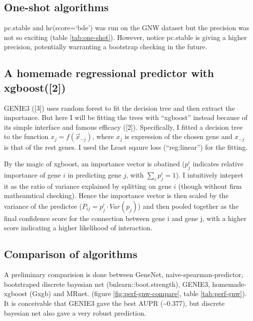 \documentclass[]{article}
\theoremstyle{definition}
\theoremstyle{definition}
\theoremstyle{definition}
\theoremstyle{remark}
\begin{document}
\subsection{One-shot algorithms}\label{one-shot-algorithms}

pc.stable and hc(score=`bde') was run on the GNW dataset but the
precision was not so exciting (table \ref{tab:one-shot}). However,
notice pc.stable is giving a higher precision, potentially warranting a
bootstrap checking in the future.

\subsection{A homemade regressional predictor with
xgboost({[}2{]})}\label{a-homemade-regressional-predictor-with-xgboostxgboost}

GENIE3 ({[}3{]}) uses random forest to fit the decision tree and then
extract the importance. But here I will be fitting the trees with
``xgboost'' instead because of its simple interface and famous efficacy
({[}2{]}). Specifically, I fitted a decision tree to the function
\(x_j = f(\vec{x}_{-j})\), where \(x_j\) is expression of the chosen
gene and \(x_{-j}\) is that of the rest genes. I used the Least sqaure
loss (``reg:linear'') for the fitting.

By the magic of xgboost, an importance vector is obatined (\(p_j^i\)
indicates relative importance of gene \(i\) in predicting gene \(j\),
with \(\sum_{i}p_j^i=1\)). I intuitively intepret it as the ratio of
variance explained by splitting on gene \(i\) (though without firm
matheamtical checking). Hence the importance vector is then scaled by
the variance of the predictee (\(P_{ij}=p_j^i\cdot Var(p_j)\)) and then
pooled together as the final confidence score for the connection between
gene i and gene j, with a higher score indicating a higher likelihood of
interaction.

\subsection{Comparison of algorithms}\label{comparison-of-algorithms}

A preliminary comparision is done between GeneNet,
naive-spearman-predictor, bootstraped discrete bayesian net
(bnlearn::boot.strength), GENIE3, homemade-xgboost (Gxgb) and MRnet.
(figure \ref{fig:perf-gnw-compare}, table \ref{tab:perf-gnw}). It is
conceivable that GENIE3 gave the best AUPR (\textasciitilde{}0.377), but
discrete bayesian net also gave a very robust prediction.
\end{document}
